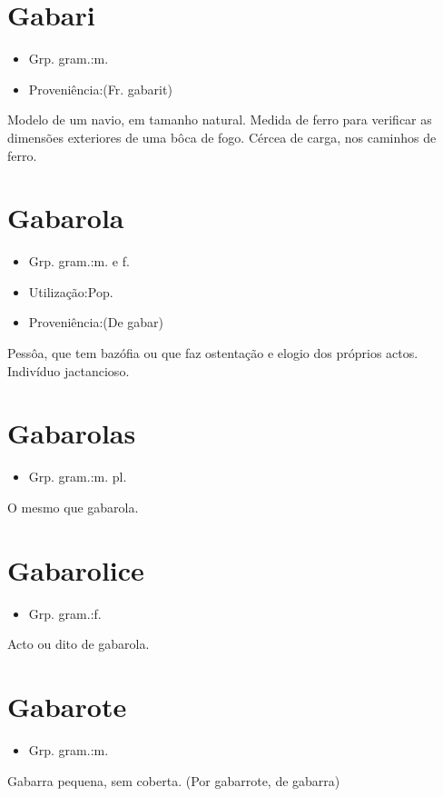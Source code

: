 \section{Gabari}
\begin{itemize}
\item {Grp. gram.:m.}
\end{itemize}
\begin{itemize}
\item {Proveniência:(Fr. \textunderscore gabarit\textunderscore )}
\end{itemize}
Modelo de um navio, em tamanho natural.
Medida de ferro para verificar as dimensões exteriores de uma bôca de fogo.
Cércea de carga, nos caminhos de ferro.
\section{Gabarola}
\begin{itemize}
\item {Grp. gram.:m.  e  f.}
\end{itemize}
\begin{itemize}
\item {Utilização:Pop.}
\end{itemize}
\begin{itemize}
\item {Proveniência:(De \textunderscore gabar\textunderscore )}
\end{itemize}
Pessôa, que tem bazófia ou que faz ostentação e elogio dos próprios actos.
Indivíduo jactancioso.
\section{Gabarolas}
\begin{itemize}
\item {Grp. gram.:m. pl.}
\end{itemize}
O mesmo que \textunderscore gabarola\textunderscore .
\section{Gabarolice}
\begin{itemize}
\item {Grp. gram.:f.}
\end{itemize}
Acto ou dito de gabarola.
\section{Gabarote}
\begin{itemize}
\item {Grp. gram.:m.}
\end{itemize}
Gabarra pequena, sem coberta.
(Por \textunderscore gabarrote\textunderscore , de \textunderscore gabarra\textunderscore )
